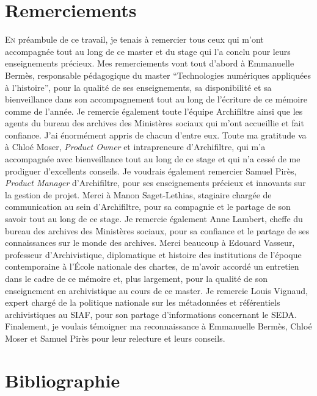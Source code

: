 \documentclass[a4paper,12pt,twoside]{book}
\begin{document}
		\newpage{\pagestyle{empty}\cleardoublepage}
	
	\chapter{Remerciements}
	
\lettrine{E}n préambule de ce travail, je tenais à remercier tous ceux qui m'ont accompagnée tout au long de ce master et du stage qui l'a conclu pour leurs enseignements précieux. 
Mes remerciements vont tout d'abord à Emmanuelle Bermès, responsable pédagogique du master \enquote{Technologies numériques appliquées à l’histoire}, pour la qualité de ses enseignements, sa disponibilité et sa bienveillance dans son accompagnement tout au long de l'écriture de ce mémoire comme de l'année. Je remercie également toute l'équipe Archifiltre ainsi que les agents du bureau des archives des Ministères sociaux qui m'ont accueillie et fait confiance. J'ai énormément appris de chacun d'entre eux. 
Toute ma gratitude va à Chloé Moser, \textit{Product Owner} et intrapreneure d'Archifiltre, qui m'a accompagnée avec bienveillance tout au long de ce stage et qui n’a cessé de me prodiguer d’excellents conseils.
Je voudrais également remercier Samuel Pirès, \textit{Product Manager} d'Archifiltre, pour ses enseignements précieux et innovants sur la gestion de projet. 
Merci à Manon Saget-Lethias, stagiaire chargée de communication au sein d'Archifiltre, pour sa compagnie et le partage de son savoir tout au long de ce stage.
Je remercie également Anne Lambert, cheffe du bureau des archives des Ministères sociaux, pour sa confiance et le partage de ses connaissances sur le monde des archives.
Merci beaucoup à Edouard Vasseur, professeur d’Archivistique, diplomatique et histoire des institutions de l’époque contemporaine à l'École nationale des chartes, de m'avoir accordé un entretien dans le cadre de ce mémoire et, plus largement, pour la qualité de son enseignement en archivistique au cours de ce master. 
Je remercie Louis Vignaud, expert chargé de la politique nationale sur les métadonnées et référentiels archivistiques au SIAF, pour son partage  d'informations concernant le SEDA. 
Finalement, je voulais témoigner ma reconnaissance à Emmanuelle Bermès, Chloé Moser et Samuel Pirès pour leur relecture et leurs conseils.

	\newpage{\pagestyle{empty}\cleardoublepage}
	
	
	
\chapter{Bibliographie}
\end{document}

